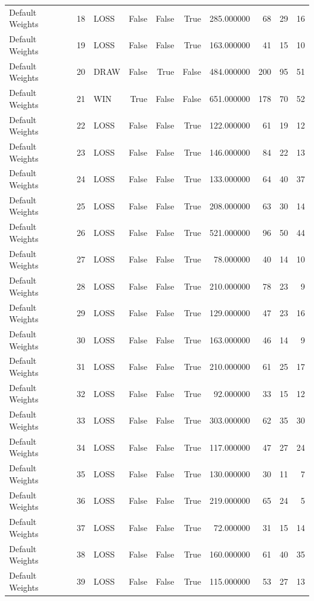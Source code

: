 \begin{table}[htbp]
\begin{tabular}{lrlrrrrrrr}
Default Weights & 18 & LOSS & False & False & True & 285.000000 & 68 & 29 & 16 \\
Default Weights & 19 & LOSS & False & False & True & 163.000000 & 41 & 15 & 10 \\
Default Weights & 20 & DRAW & False & True & False & 484.000000 & 200 & 95 & 51 \\
Default Weights & 21 & WIN & True & False & False & 651.000000 & 178 & 70 & 52 \\
Default Weights & 22 & LOSS & False & False & True & 122.000000 & 61 & 19 & 12 \\
Default Weights & 23 & LOSS & False & False & True & 146.000000 & 84 & 22 & 13 \\
Default Weights & 24 & LOSS & False & False & True & 133.000000 & 64 & 40 & 37 \\
Default Weights & 25 & LOSS & False & False & True & 208.000000 & 63 & 30 & 14 \\
Default Weights & 26 & LOSS & False & False & True & 521.000000 & 96 & 50 & 44 \\
Default Weights & 27 & LOSS & False & False & True & 78.000000 & 40 & 14 & 10 \\
Default Weights & 28 & LOSS & False & False & True & 210.000000 & 78 & 23 & 9 \\
Default Weights & 29 & LOSS & False & False & True & 129.000000 & 47 & 23 & 16 \\
Default Weights & 30 & LOSS & False & False & True & 163.000000 & 46 & 14 & 9 \\
Default Weights & 31 & LOSS & False & False & True & 210.000000 & 61 & 25 & 17 \\
Default Weights & 32 & LOSS & False & False & True & 92.000000 & 33 & 15 & 12 \\
Default Weights & 33 & LOSS & False & False & True & 303.000000 & 62 & 35 & 30 \\
Default Weights & 34 & LOSS & False & False & True & 117.000000 & 47 & 27 & 24 \\
Default Weights & 35 & LOSS & False & False & True & 130.000000 & 30 & 11 & 7 \\
Default Weights & 36 & LOSS & False & False & True & 219.000000 & 65 & 24 & 5 \\
Default Weights & 37 & LOSS & False & False & True & 72.000000 & 31 & 15 & 14 \\
Default Weights & 38 & LOSS & False & False & True & 160.000000 & 61 & 40 & 35 \\
Default Weights & 39 & LOSS & False & False & True & 115.000000 & 53 & 27 & 13 \\

\end{tabular}
\end{table}
